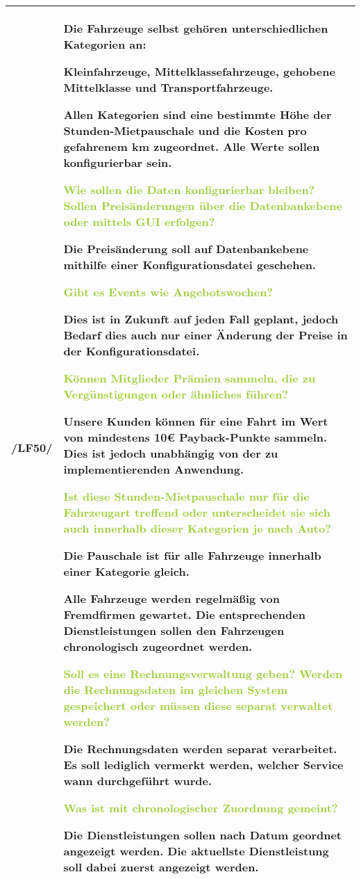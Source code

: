 \begin{tabular}[ht] {l | p{13cm}}
    \hline
    /LF50/ & Die Fahrzeuge selbst gehören unterschiedlichen Kategorien an: 

    Kleinfahrzeuge, Mittelklassefahrzeuge, gehobene Mittelklasse und Transportfahrzeuge.  

    Allen Kategorien sind eine bestimmte Höhe der Stunden-Mietpauschale und die Kosten pro gefahrenem km zugeordnet. Alle Werte sollen konfigurierbar sein. 

    \textcolor{YellowGreen}{Wie sollen die Daten konfigurierbar bleiben? Sollen Preisänderungen über die Datenbankebene oder mittels GUI erfolgen?}

    \textcolor{NavyBlue}{Die Preisänderung soll auf Datenbankebene mithilfe einer Konfigurationsdatei geschehen.}

    \textcolor{YellowGreen}{Gibt es Events wie Angebotswochen?}

    \textcolor{NavyBlue}{Dies ist in Zukunft auf jeden Fall geplant, jedoch Bedarf dies auch nur einer Änderung der Preise in der Konfigurationsdatei.}

    \textcolor{YellowGreen}{Können Mitglieder Prämien sammeln, die zu Vergünstigungen oder ähnliches führen?}

    \textcolor{NavyBlue}{Unsere Kunden können für eine Fahrt im Wert von mindestens 10€ Payback-Punkte sammeln. Dies ist jedoch unabhängig von der zu implementierenden Anwendung.}

    \textcolor{YellowGreen}{Ist diese Stunden-Mietpauschale nur für die Fahrzeugart treffend oder unterscheidet sie sich auch innerhalb dieser Kategorien je nach Auto?}

    \textcolor{NavyBlue}{Die Pauschale ist für alle Fahrzeuge innerhalb einer Kategorie gleich.}

    Alle Fahrzeuge werden regelmäßig von Fremdfirmen gewartet. Die entsprechenden Dienstleistungen sollen den Fahrzeugen chronologisch zugeordnet werden. 
    
    \textcolor{YellowGreen}{Soll es eine Rechnungsverwaltung geben? Werden die Rechnungsdaten im gleichen System gespeichert oder müssen diese separat verwaltet werden?}

    \textcolor{NavyBlue}{Die Rechnungsdaten werden separat verarbeitet. Es soll lediglich vermerkt werden, welcher Service wann durchgeführt wurde.}

    \textcolor{YellowGreen}{Was ist mit chronologischer Zuordnung gemeint?}

    \textcolor{NavyBlue}{Die Dienstleistungen sollen nach Datum geordnet angezeigt werden. Die aktuellste Dienstleistung soll dabei zuerst angezeigt werden.}
    \\
    \hline
\end{tabular}

